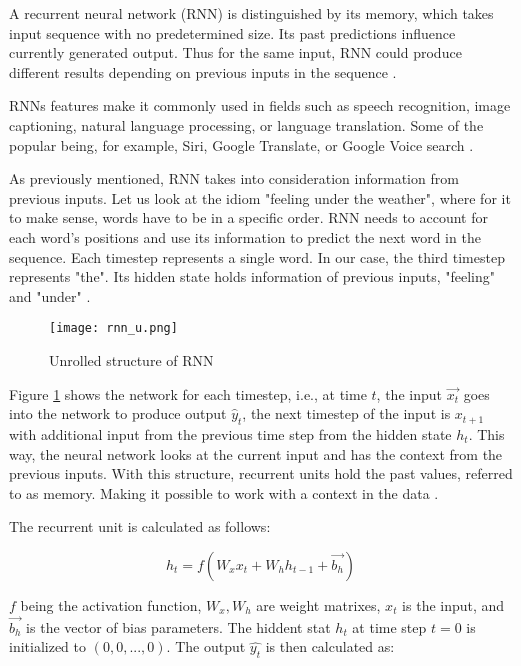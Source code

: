 A recurrent neural network (RNN) is distinguished by its memory, which takes input sequence with no predetermined size. Its past predictions influence currently generated output. Thus for the same input, RNN could produce different results depending on previous inputs in the sequence \cite{rnnDSmedium}.

RNNs features make it commonly used in fields such as speech recognition, image captioning, natural language processing, or language translation. Some of the popular being, for example, Siri, Google Translate, or Google Voice search \cite{ibmrnn}.

As previously mentioned, RNN takes into consideration information from previous inputs. Let us look at the idiom "feeling under the weather", where for it to make sense, words have to be in a specific order. RNN needs to account for each word's positions and use its information to predict the next word in the sequence. Each timestep represents a single word. In our case, the third timestep represents "the". Its hidden state holds information of previous inputs, "feeling" and "under" \cite{ibmrnn}.

\begin{figure}[h]
    \centering
    \texttt{[image: rnn\_u.png]}
    \caption{Unrolled structure of RNN \cite{matous}}
    \label{fig:rnn}
\end{figure}


Figure \ref{fig:rnn} shows the network for each timestep, i.e., at time $t$, the input $\vec{x_t}$ goes into the network to produce output $\hat{y}_t$, the next timestep of the input is $x_{t+1}$ with additional input from the previous time step from the hidden state $h_{t}$. This way, the neural network looks at the current input and has the context from the previous inputs.
With this structure, recurrent units hold the past values, referred to as memory. Making it possible to work with a context in the data \cite{rnnin6}.

The recurrent unit is calculated as follows:

\begin{equation}
    {h_t = f(W_{x}x_t + W_{h}h_{t-1}+\vec{b_h})}
\end{equation}

$f$ being the activation function, $W_x,W_h$ are weight matrixes, $x_t$ is the input, and $\vec{b_h}$ is the vector of bias parameters. The hiddent stat $h_t$ at time step $t=0$ is initialized to $(0,0,...,0)$. The output $\hat{y_t}$ is then calculated as:

